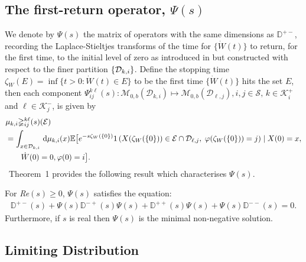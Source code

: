 \subsection{The first-return operator, $\mathbb\Psi(s)$}\label{sec: intro Psi}
We denote by $\mathbb \Psi(s)$ the matrix of operators with the same dimensions as \(\mathbb D^{+-}\), recording the Laplace-Stieltjes transforms of the time for $\{\dot W(t)\}$ to return, for the first time, to the initial level of zero as introduced in \cite{bo2014} but constructed with respect to the finer partition \(\{\mathcal{D}_{k,i}\}\). Define the stopping time $\zeta_W(E)= \inf \{t > 0: \dot W(t) \in E\}$ to be the first time $\{\dot W(t)\}$ hits the set $E$, then each component $\mathbb \Psi_{ij}^{k\ell}(s): \mathcal{M}_{0,b}(\mathcal D_{k,i}) \mapsto \mathcal{M}_{0,b}(\mathcal D_{\ell,j}), i,j \in \mathcal{S},\,k\in\mathcal K_i^+$ and $\ell \in \mathcal K_j^-$, is given by  
% 
\begin{align*} 
	&\mu_{k,i}\mathbb\Psi_{ij}^{k\ell}(s) (\mathcal{E}) 
	\\& = \int_{x \in \mathcal{D}_{k,i}} \, \mathrm{d} \mu_{k,i}(x)
	 \mathbb{E}\big[e^{-s\zeta_W(\{0\})}1\left(X({\zeta_W(\{0\})}) \in \mathcal{E}\cap\mathcal{D}_{\ell,j},\; \varphi({\zeta_W(\{0\})}) = j \right) \mid X(0) = x, 
	 \\&\qquad{} \dot W(0) = 0, \varphi(0) = i\big].
\end{align*} 
\cite{bo2014}~Theorem~1 provides the following result which characterises \(\mathbb\Psi(s)\).
\begin{theo} 
	\label{theo:Psi} 
	For \textit{Re}$(s) \geq 0$, $\mathbb\Psi(s)$ satisfies the  equation: 
	\begin{align*} 
		\mathbb{D}^{+-}(s) + \mathbb\Psi(s)\mathbb{D}^{-+}(s)\mathbb\Psi(s) + \mathbb{D}^{++}(s)\mathbb\Psi(s) + \mathbb\Psi(s)\mathbb{D}^{--}(s) = 0. 
	\end{align*} 
	Furthermore, if $s$ is real then $\mathbb\Psi(s)$ is the minimal non-negative solution. 
\end{theo} 

\subsection{Limiting Distribution} 

